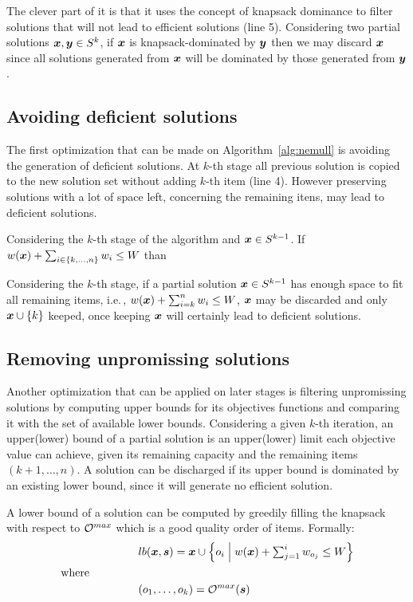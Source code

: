 The clever part of it is that it uses the concept of knapsack dominance
to filter solutions that will not lead to efficient solutions (line 5).
Considering two partial solutions $\boldsymbol{x}, \boldsymbol{y} \in S^k$, if
$\boldsymbol{x}$ is knapsack-dominated by $\boldsymbol{y}$ then we may discard $\boldsymbol{x}$ since all
solutions generated from $\boldsymbol{x}$ will be dominated by those generated from $\boldsymbol{y}$.

\subsection{Avoiding deficient solutions}

The first optimization that can be made on Algorithm~\ref{alg:nemull} is
avoiding the generation of deficient solutions.
At $k$-th stage all previous solution is copied to the
new solution set without adding $k$-th item (line 4).
However preserving solutions with a lot of space left, concerning the remaining itens,
may lead to deficient solutions.

\begin{theorem}
   Considering the $k$-th stage of the algorithm and $\boldsymbol{x} \in S^{k-1}$.
   If $w(\boldsymbol{x}) + \sum_{i \in {\{k, \ldots, n\}}} w_i \leq W$ than
\end{theorem}

Considering the $k$-th stage, if a partial solution $\boldsymbol{x} \in S^{k-1}$ has enough
space to fit all remaining items, i.e.\,, $w(\boldsymbol{x}) + \sum_{i=k}^n w_i \leq W$,
$\boldsymbol{x}$ may be discarded and only $\boldsymbol{x} \cup \{k\}$ keeped, once
keeping $\boldsymbol{x}$ will certainly lead to deficient solutions.

\subsection{Removing unpromissing solutions}

Another optimization that can be applied on later stages is
filtering unpromissing solutions by computing upper bounds for its objectives
functions and comparing it with the set of available lower bounds.
Considering a given $k$-th iteration, an upper(lower) bound of a partial solution
is an upper(lower) limit each objective value can achieve,
given its remaining capacity and the remaining items $(k+1, \ldots, n)$.
A solution can be discharged if its upper bound is dominated by an existing lower bound, since it will generate no efficient solution.

A lower bound of a solution can be computed by greedily filling the
knapsack with respect to $\mathcal{O}^{max}$ which is a good quality order of items.
Formally:
\begin{align*}
    &lb(\boldsymbol{x}, \boldsymbol{s}) = \boldsymbol{x} \cup
      \left\{ o_i \;\middle|\; w(\boldsymbol{x}) + \textstyle\sum_{j=1}^i w_{o_j} \leq W \right\} \\
  \text{where} \phantom{mmmmm} \\
    &(o_1, \ldots, o_k) = \mathcal{O}^{max}(\boldsymbol{s}) \\
\end{align*}


